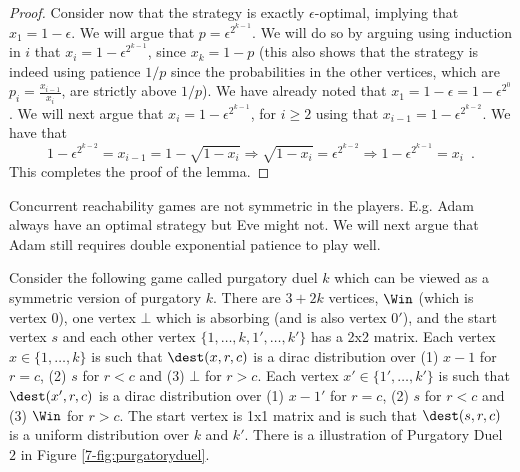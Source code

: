 \begin{proof}
Consider now that the strategy is exactly $\epsilon$-optimal, implying that $x_1=1-\epsilon$. 
We will argue that $p=\epsilon^{2^{k-1}}$.
We will do so by arguing  using induction in $i$ that $x_i=1-\epsilon^{2^{k-1}}$, since $x_k=1-p$ (this also shows that the strategy is indeed using patience $1/p$ since the probabilities in the other vertices, which are $p_i=\frac{x_{i-1}}{x_i}$, are strictly above $1/p$).
We have already noted that  $x_1=1-\epsilon=1-\epsilon^{2^0}$.
We will next argue that $x_i=1-\epsilon^{2^{k-1}}$, for $i\geq 2$ using that $x_{i-1}=1-\epsilon^{2^{k-2}}$.
We have that \[
1-\epsilon^{2^{k-2}}=x_{i-1}=1-\sqrt{1-x_{i}}\Rightarrow \sqrt{1-x_{i}}= \epsilon^{2^{k-2}}\Rightarrow
1-\epsilon^{2^{k-1}}=x_i\enspace .
\]
This completes the proof of the lemma.
\end{proof}

Concurrent reachability games are not symmetric in the players. E.g. Adam always have an optimal strategy but Eve might not. We will next argue that Adam still requires double exponential patience to play well.

Consider the following game called purgatory duel $k$ which can be viewed as a symmetric version of purgatory $k$.
There are $3+2k$ vertices, $\Win$ (which is vertex 0), one vertex $\bot$ which is absorbing (and is also vertex $0'$), and the start vertex $s$ and each other vertex $\{1,\dots, k,1',\dots,k'\}$ has a 2x2 matrix. Each vertex $x\in \{1,\dots, k\}$ is such that $\dest(x,r,c)$ is a dirac distribution over (1) $x-1$ for $r=c$, (2) $s$ for $r<c$ and (3) $\bot$ for $r>c$.
 Each vertex $x'\in \{1',\dots, k'\}$ is such that $\dest(x',r,c)$ is a dirac distribution over (1) $x-1'$ for $r=c$, (2) $s$ for $r<c$ and (3) $\Win$ for $r>c$. The start vertex is 1x1 matrix and is such that $\dest(s,r,c)$ is a uniform distribution over $k$ and $k'$.
There is a illustration of Purgatory Duel $2$ in Figure \cref{7-fig:purgatoryduel}.


